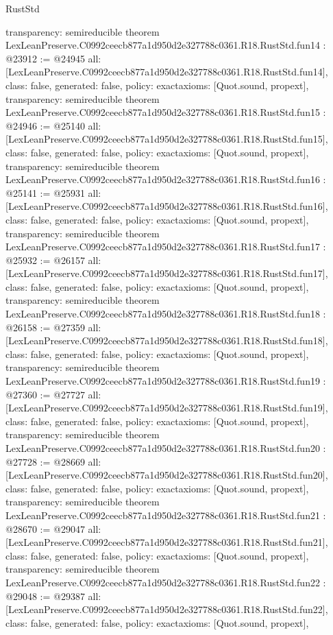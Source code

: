 \begin{lexlean}{RustStd}
\begin{coremodule}
{  transparency: semireducible
}
theorem LexLeanPreserve.C0992ceecb877a1d950d2e327788c0361.R18.RustStd.fun14 : @23912 := @24945 {
  all: [LexLeanPreserve.C0992ceecb877a1d950d2e327788c0361.R18.RustStd.fun14],
  class: false,
  generated: false,
  policy: exact{axioms: [Quot.sound, propext]},
  transparency: semireducible
}
theorem LexLeanPreserve.C0992ceecb877a1d950d2e327788c0361.R18.RustStd.fun15 : @24946 := @25140 {
  all: [LexLeanPreserve.C0992ceecb877a1d950d2e327788c0361.R18.RustStd.fun15],
  class: false,
  generated: false,
  policy: exact{axioms: [Quot.sound, propext]},
  transparency: semireducible
}
theorem LexLeanPreserve.C0992ceecb877a1d950d2e327788c0361.R18.RustStd.fun16 : @25141 := @25931 {
  all: [LexLeanPreserve.C0992ceecb877a1d950d2e327788c0361.R18.RustStd.fun16],
  class: false,
  generated: false,
  policy: exact{axioms: [Quot.sound, propext]},
  transparency: semireducible
}
theorem LexLeanPreserve.C0992ceecb877a1d950d2e327788c0361.R18.RustStd.fun17 : @25932 := @26157 {
  all: [LexLeanPreserve.C0992ceecb877a1d950d2e327788c0361.R18.RustStd.fun17],
  class: false,
  generated: false,
  policy: exact{axioms: [Quot.sound, propext]},
  transparency: semireducible
}
theorem LexLeanPreserve.C0992ceecb877a1d950d2e327788c0361.R18.RustStd.fun18 : @26158 := @27359 {
  all: [LexLeanPreserve.C0992ceecb877a1d950d2e327788c0361.R18.RustStd.fun18],
  class: false,
  generated: false,
  policy: exact{axioms: [Quot.sound, propext]},
  transparency: semireducible
}
theorem LexLeanPreserve.C0992ceecb877a1d950d2e327788c0361.R18.RustStd.fun19 : @27360 := @27727 {
  all: [LexLeanPreserve.C0992ceecb877a1d950d2e327788c0361.R18.RustStd.fun19],
  class: false,
  generated: false,
  policy: exact{axioms: [Quot.sound, propext]},
  transparency: semireducible
}
theorem LexLeanPreserve.C0992ceecb877a1d950d2e327788c0361.R18.RustStd.fun20 : @27728 := @28669 {
  all: [LexLeanPreserve.C0992ceecb877a1d950d2e327788c0361.R18.RustStd.fun20],
  class: false,
  generated: false,
  policy: exact{axioms: [Quot.sound, propext]},
  transparency: semireducible
}
theorem LexLeanPreserve.C0992ceecb877a1d950d2e327788c0361.R18.RustStd.fun21 : @28670 := @29047 {
  all: [LexLeanPreserve.C0992ceecb877a1d950d2e327788c0361.R18.RustStd.fun21],
  class: false,
  generated: false,
  policy: exact{axioms: [Quot.sound, propext]},
  transparency: semireducible
}
theorem LexLeanPreserve.C0992ceecb877a1d950d2e327788c0361.R18.RustStd.fun22 : @29048 := @29387 {
  all: [LexLeanPreserve.C0992ceecb877a1d950d2e327788c0361.R18.RustStd.fun22],
  class: false,
  generated: false,
  policy: exact{axioms: [Quot.sound, propext]},
}
\end{coremodule}
\end{lexlean}
